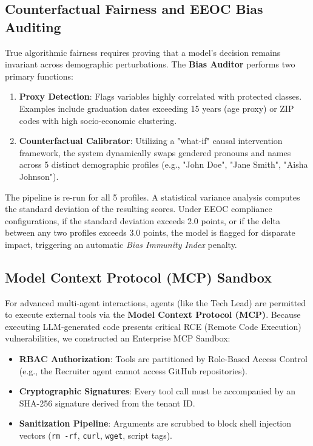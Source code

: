 \documentclass[10pt,journal,compsoc]{IEEEtran}
\begin{document}
\subsection{Counterfactual Fairness and EEOC Bias Auditing}
True algorithmic fairness requires proving that a model's decision remains invariant across demographic perturbations. The \textbf{Bias Auditor} performs two primary functions:
\begin{enumerate}
    \item \textbf{Proxy Detection}: Flags variables highly correlated with protected classes. Examples include graduation dates exceeding 15 years (age proxy) or ZIP codes with high socio-economic clustering.
    \item \textbf{Counterfactual Calibrator}: Utilizing a "what-if" causal intervention framework, the system dynamically swaps gendered pronouns and names across 5 distinct demographic profiles (e.g., "John Doe", "Jane Smith", "Aisha Johnson"). 
\end{enumerate}
The pipeline is re-run for all 5 profiles. A statistical variance analysis computes the standard deviation of the resulting scores. Under EEOC compliance configurations, if the standard deviation exceeds 2.0 points, or if the delta between any two profiles exceeds 3.0 points, the model is flagged for disparate impact, triggering an automatic \textit{Bias Immunity Index} penalty.

\subsection{Model Context Protocol (MCP) Sandbox}
For advanced multi-agent interactions, agents (like the Tech Lead) are permitted to execute external tools via the \textbf{Model Context Protocol (MCP)}. Because executing LLM-generated code presents critical RCE (Remote Code Execution) vulnerabilities, we constructed an Enterprise MCP Sandbox:
\begin{itemize}
    \item \textbf{RBAC Authorization}: Tools are partitioned by Role-Based Access Control (e.g., the Recruiter agent cannot access GitHub repositories).
    \item \textbf{Cryptographic Signatures}: Every tool call must be accompanied by an SHA-256 signature derived from the tenant ID.
    \item \textbf{Sanitization Pipeline}: Arguments are scrubbed to block shell injection vectors (\texttt{rm -rf}, \texttt{curl}, \texttt{wget}, script tags).
\end{itemize}
\end{document}
